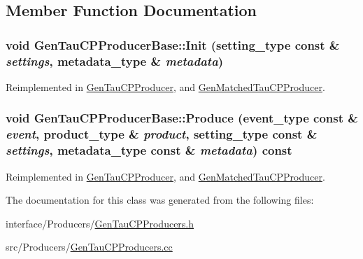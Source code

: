 \subsection{Member Function Documentation}
\hypertarget{classGenTauCPProducerBase_a5eacebc116568fa618c6171e5e04fd09}{
\subsubsection[{Init}]{\setlength{\rightskip}{0pt plus 5cm}void GenTauCPProducerBase::Init (setting\_\-type const \& {\em settings}, \/  metadata\_\-type \& {\em metadata})}}
\label{classGenTauCPProducerBase_a5eacebc116568fa618c6171e5e04fd09}


Reimplemented in \hyperlink{classGenTauCPProducer_a23653a610d8e1db8666e35c3793d1eb4}{GenTauCPProducer}, and \hyperlink{classGenMatchedTauCPProducer_a408a6629682820189c1236cd6453374c}{GenMatchedTauCPProducer}.\hypertarget{classGenTauCPProducerBase_a99bde6a5233f6794dfac7a744dfa69c5}{
\subsubsection[{Produce}]{\setlength{\rightskip}{0pt plus 5cm}void GenTauCPProducerBase::Produce (event\_\-type const \& {\em event}, \/  product\_\-type \& {\em product}, \/  setting\_\-type const \& {\em settings}, \/  metadata\_\-type const \& {\em metadata}) const}}
\label{classGenTauCPProducerBase_a99bde6a5233f6794dfac7a744dfa69c5}


Reimplemented in \hyperlink{classGenTauCPProducer_a2ae8772bad72e005ac04ec307f6c1ae0}{GenTauCPProducer}, and \hyperlink{classGenMatchedTauCPProducer_a82b615c1d349a3f1d65ede4379e18758}{GenMatchedTauCPProducer}.

The documentation for this class was generated from the following files:\begin{DoxyCompactItemize}
\item 
interface/Producers/\hyperlink{GenTauCPProducers_8h}{GenTauCPProducers.h}\item 
src/Producers/\hyperlink{GenTauCPProducers_8cc}{GenTauCPProducers.cc}\end{DoxyCompactItemize}
